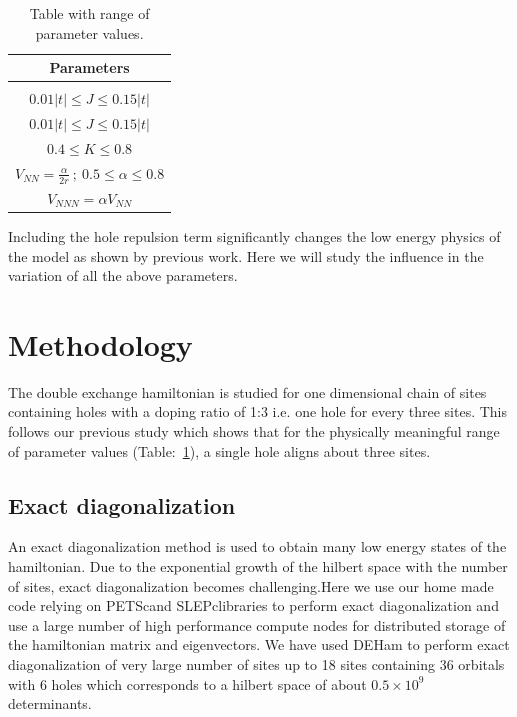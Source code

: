 \documentclass[12pt,twoside]{report}
\newcommand{\citepetsc}{\cite{petsc_web_page,petsc_user_ref,petsc_efficient}}
\newcommand{\citeslepc}{\cite{Hernandez_2003_SSL,slepc_users_manual}}
\begin{document}
	\begin{table}[h!]
		\centering
		\begin{tabular}{||c||}
			\hline
			Parameters  \\ [0.5ex]
			\hline\hline
			\\
			$ 0.01\lvert t \rvert \le J \le 0.15\lvert t \rvert $    \\ [1ex]
			$ 0.01\lvert t \rvert \le J \le 0.15\lvert t \rvert $    \\ [1ex]
			$ 0.4 \le K \le 0.8 $                                    \\ [1ex]
			$ V_{NN} = \frac{\alpha}{2r}\ ;\ 0.5 \le \alpha \le 0.8 $ \\ [1ex]
			$ V_{NNN} = \alpha V_{NN} $                                \\ [1ex]
			\hline
		\end{tabular}
		\label{tab:params}
		\caption{Table with range of parameter values.}
	\end{table}
	
	Including the hole repulsion term significantly changes the low energy physics
	of the model as shown by previous work\cite{calzado_proposal_2001}. Here we will
	study the influence in the variation of all the above parameters.
	
	
	\chapter{Methodology}
	
	The double exchange hamiltonian is studied for one dimensional chain
	of sites containing holes with a doping ratio of 1:3 i.e. one hole for every
	three sites. This follows our previous study which shows that for
	the physically meaningful range of parameter values (Table:~\ref{tab:params}),
	a single hole aligns about three sites.\cite{crystals_chilkuri}
	
	\section{Exact diagonalization}
	
	An exact diagonalization method is used to obtain many low energy states of the
	hamiltonian. Due to the exponential growth of the hilbert space with the number
	of sites, exact diagonalization becomes challenging.Here we use our home made
	code relying on PETSc\citepetsc and SLEPc\citeslepc libraries to perform exact diagonalization and
	use a large number of high performance compute nodes for distributed storage of
	the hamiltonian matrix and eigenvectors. We have used DEHam\cite{deham} to
	perform exact diagonalization of very large number of sites up to 18 sites
	containing 36 orbitals with 6 holes which corresponds to a hilbert space of
	about $0.5 \times 10^9$ determinants.
	
\end{document}
